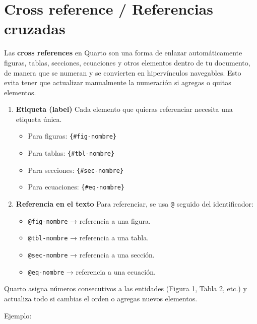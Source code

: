 \documentclass[
  spanish,
  12pt,
  letterpaper,
  DIV=11,
  numbers=noendperiod]{scrreprt}
\providecommand{\tightlist}{%
  \setlength{\itemsep}{0pt}\setlength{\parskip}{0pt}}
\begin{document}
\section{Cross reference / Referencias
cruzadas}\label{cross-reference-referencias-cruzadas}

Las \textbf{cross references} en Quarto son una forma de enlazar
automáticamente figuras, tablas, secciones, ecuaciones y otros elementos
dentro de tu documento, de manera que se numeran y se convierten en
hipervínculos navegables. Esto evita tener que actualizar manualmente la
numeración si agregas o quitas elementos.

\begin{enumerate}
\def\labelenumi{\arabic{enumi}.}
\item
  \textbf{Etiqueta (label)} Cada elemento que quieras referenciar
  necesita una etiqueta única.

  \begin{itemize}
  \tightlist
  \item
    Para figuras: \texttt{\{\#fig-nombre\}}
  \item
    Para tablas: \texttt{\{\#tbl-nombre\}}
  \item
    Para secciones: \texttt{\{\#sec-nombre\}}
  \item
    Para ecuaciones: \texttt{\{\#eq-nombre\}}
  \end{itemize}
\item
  \textbf{Referencia en el texto} Para referenciar, se usa \texttt{@}
  seguido del identificador:

  \begin{itemize}
  \tightlist
  \item
    \texttt{@fig-nombre} → referencia a una figura.
  \item
    \texttt{@tbl-nombre} → referencia a una tabla.
  \item
    \texttt{@sec-nombre} → referencia a una sección.
  \item
    \texttt{@eq-nombre} → referencia a una ecuación.
  \end{itemize}
\end{enumerate}

Quarto asigna números consecutivos a las entidades (Figura 1, Tabla 2,
etc.) y actualiza todo si cambias el orden o agregas nuevos elementos.

Ejemplo:
\end{document}
